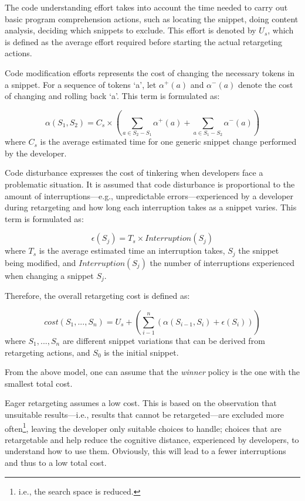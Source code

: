 The code understanding effort takes into account the time needed to carry out basic program comprehension actions, such as locating the snippet, doing content analysis, deciding which snippets to exclude. This effort is denoted by $U_{s}$, which is defined as the average effort required before starting the actual retargeting actions.

Code modification efforts represents the cost of changing the necessary tokens in a snippet. For a sequence of tokens `a', let $\alpha^{+}(a)$ and $\alpha^{-}(a)$ denote the cost of changing and rolling back `a'. This term is formulated as: 

\begin{equation}
	\alpha(S_{1}, S_{2}) = C_{s} \times (\sum_{a \in S_2 - S_1}\alpha^{+}(a) + \sum_{a \in S_1 - S_2}\alpha^{-}(a))
	\label{costmodification}
\end{equation} where $C_{s}$ is the average estimated time for one generic snippet change performed by the developer.

Code disturbance expresses the cost of tinkering\cite{Jadud:2006ir} when developers face a problematic situation. It is assumed that code disturbance is proportional to the amount of interruptions---e.g., unpredictable errors---experienced by a developer during retargeting and how long each interruption takes as a snippet varies. This term is formulated as:

\begin{equation}
	\epsilon(S_{j}) = T_{s} \times Interruption(S_j)
	\label{costmodification}
\end{equation} where $T_{s}$ is the average estimated time an interruption takes, $S_j$ the snippet being modified, and $Interruption(S_j)$ the number of interruptions experienced when changing a snippet $S_j$. 

Therefore, the overall retargeting cost is defined as:

\begin{equation}
	cost(S_1, ..., S_n) = U_s + (\sum_{i-1}^{n}(\alpha(S_{i-1}, S_{i}) + \epsilon(S_{i})))
	\label{totalWork}
\end{equation} where $S_1, ..., S_n$ are different snippet variations that can be derived from retargeting actions, and $S_0$ is the initial snippet.   

From the above model, one can assume that the \emph{winner} policy is the one with the smallest total cost.

Eager retargeting assumes a low cost. This is based on the observation that unsuitable results---i.e., results that cannot be retargeted---are excluded more often\footnote{i.e., the search space is reduced.}, leaving the developer only suitable choices to handle; choices that are retargetable and help reduce the cognitive distance\cite{Krueger:1992wf}, experienced by developers, to understand how to use them. Obviously, this will lead to a fewer interruptions and thus to a low total cost.  

